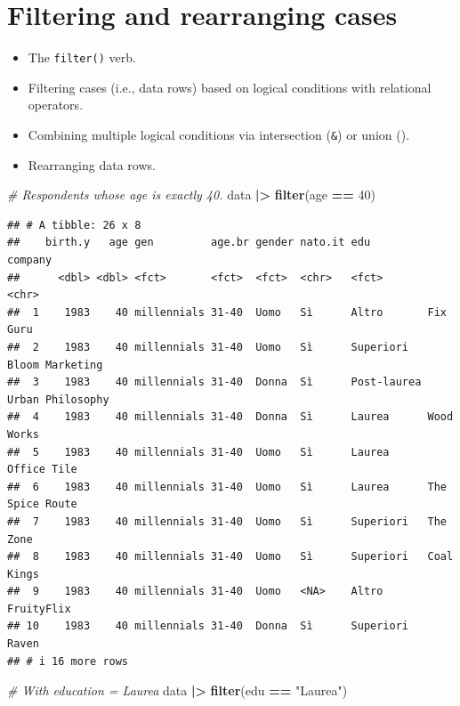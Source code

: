 \documentclass[
]{book}
\newenvironment{Shaded}{\begin{snugshade}}{\end{snugshade}}
\newcommand{\CommentTok}[1]{\textcolor[rgb]{0.56,0.35,0.01}{\textit{#1}}}
\newcommand{\DecValTok}[1]{\textcolor[rgb]{0.00,0.00,0.81}{#1}}
\newcommand{\FunctionTok}[1]{\textcolor[rgb]{0.13,0.29,0.53}{\textbf{#1}}}
\newcommand{\NormalTok}[1]{#1}
\newcommand{\SpecialCharTok}[1]{\textcolor[rgb]{0.81,0.36,0.00}{\textbf{#1}}}
\newcommand{\StringTok}[1]{\textcolor[rgb]{0.31,0.60,0.02}{#1}}
\providecommand{\tightlist}{%
  \setlength{\itemsep}{0pt}\setlength{\parskip}{0pt}}
\begin{document}
\hypertarget{filtering-and-rearranging-cases}{%
\section{Filtering and rearranging cases}\label{filtering-and-rearranging-cases}}

\begin{itemize}
\tightlist
\item
  The \texttt{filter()} verb.
\item
  Filtering cases (i.e., data rows) based on logical conditions with relational operators.
\item
  Combining multiple logical conditions via intersection (\texttt{\&}) or union (\texttt{\textbar{}}).
\item
  Rearranging data rows.
\end{itemize}

\begin{Shaded}
\begin{Highlighting}[]
\CommentTok{\# Respondents whose age is exactly 40.}
\NormalTok{data }\SpecialCharTok{|\textgreater{}} 
  \FunctionTok{filter}\NormalTok{(age }\SpecialCharTok{==} \DecValTok{40}\NormalTok{)}
\end{Highlighting}
\end{Shaded}

\begin{verbatim}
## # A tibble: 26 x 8
##    birth.y   age gen         age.br gender nato.it edu         company         
##      <dbl> <dbl> <fct>       <fct>  <fct>  <chr>   <fct>       <chr>           
##  1    1983    40 millennials 31-40  Uomo   Sì      Altro       Fix Guru        
##  2    1983    40 millennials 31-40  Uomo   Sì      Superiori   Bloom Marketing 
##  3    1983    40 millennials 31-40  Donna  Sì      Post-laurea Urban Philosophy
##  4    1983    40 millennials 31-40  Donna  Sì      Laurea      Wood Works      
##  5    1983    40 millennials 31-40  Uomo   Sì      Laurea      Office Tile     
##  6    1983    40 millennials 31-40  Uomo   Sì      Laurea      The Spice Route 
##  7    1983    40 millennials 31-40  Uomo   Sì      Superiori   The Zone        
##  8    1983    40 millennials 31-40  Uomo   Sì      Superiori   Coal Kings      
##  9    1983    40 millennials 31-40  Uomo   <NA>    Altro       FruityFlix      
## 10    1983    40 millennials 31-40  Donna  Sì      Superiori   Raven           
## # i 16 more rows
\end{verbatim}

\begin{Shaded}
\begin{Highlighting}[]
\CommentTok{\# With education = Laurea}
\NormalTok{data }\SpecialCharTok{|\textgreater{}} 
  \FunctionTok{filter}\NormalTok{(edu }\SpecialCharTok{==} \StringTok{"Laurea"}\NormalTok{)}
\end{Highlighting}
\end{Shaded}
\end{document}
